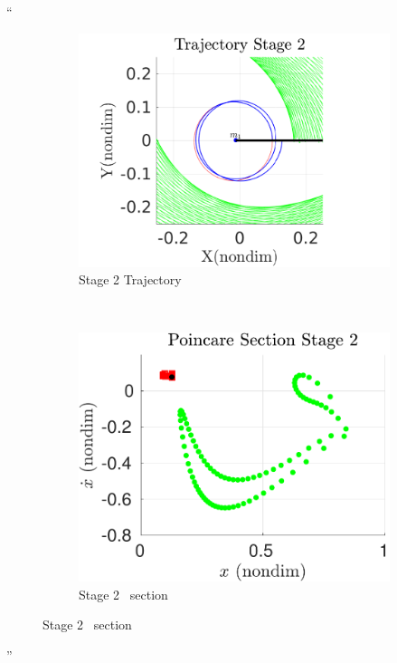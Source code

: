\documentclass[11pt]{article}
\newenvironment{correction}{\begin{list}{}{\setlength{\leftmargin}{1cm}\setlength{\rightmargin}{1cm}}\vspace{\parsep}\item[]``}{''\end{list}}
\begin{document}
\begin{enumerate}
\begin{correction}
\begin{figure}[H]
    \begin{subfigure}[htbp]{0.2\textwidth} 
        \includegraphics[width=\textwidth, keepaspectratio]{figures/geo_transfer/stage2_trajectory_zoom.pdf} 
        \caption{Stage 2 Trajectory~} 
    \end{subfigure}~
    \begin{subfigure}[htbp]{0.2\textwidth} 
        \includegraphics[width=\textwidth, keepaspectratio]{figures/geo_transfer/stage2_poincare.pdf} 
        \caption{Stage 2 \Poincare~section } 
    \end{subfigure}


\end{figure}
\end{correction}
\end{enumerate}
\end{document}
